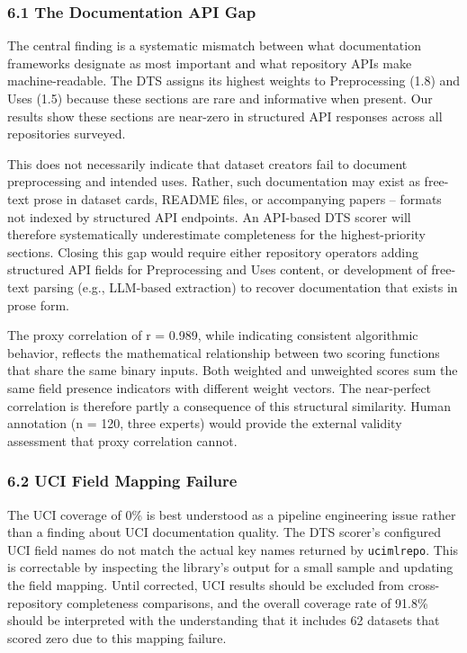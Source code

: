 
\subsubsection{6.1 The Documentation API Gap}

The central finding is a systematic mismatch between what documentation frameworks designate as most important and what repository APIs make machine-readable. The DTS assigns its highest weights to Preprocessing (1.8) and Uses (1.5) because these sections are rare and informative when present. Our results show these sections are near-zero in structured API responses across all repositories surveyed.

This does not necessarily indicate that dataset creators fail to document preprocessing and intended uses. Rather, such documentation may exist as free-text prose in dataset cards, README files, or accompanying papers -- formats not indexed by structured API endpoints. An API-based DTS scorer will therefore systematically underestimate completeness for the highest-priority sections. Closing this gap would require either repository operators adding structured API fields for Preprocessing and Uses content, or development of free-text parsing (e.g., LLM-based extraction) to recover documentation that exists in prose form.

The proxy correlation of r = 0.989, while indicating consistent algorithmic behavior, reflects the mathematical relationship between two scoring functions that share the same binary inputs. Both weighted and unweighted scores sum the same field presence indicators with different weight vectors. The near-perfect correlation is therefore partly a consequence of this structural similarity. Human annotation (n = 120, three experts) would provide the external validity assessment that proxy correlation cannot.

\subsubsection{6.2 UCI Field Mapping Failure}

The UCI coverage of 0\% is best understood as a pipeline engineering issue rather than a finding about UCI documentation quality. The DTS scorer's configured UCI field names do not match the actual key names returned by \texttt{ucimlrepo}. This is correctable by inspecting the library's output for a small sample and updating the field mapping. Until corrected, UCI results should be excluded from cross-repository completeness comparisons, and the overall coverage rate of 91.8\% should be interpreted with the understanding that it includes 62 datasets that scored zero due to this mapping failure.

